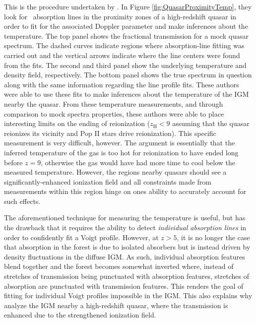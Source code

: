 This is the procedure undertaken by \cite{BoltonQuasar}. In Figure \ref{fig:QuasarProximityTemp}, they look for \lya\ absorption lines in the proximity zones of a high-redshift quasar in order to fit for the associated Doppler parameter and make inferences about the temperature. The top panel shows the fractional transmission for a mock quasar spectrum. The dashed curves indicate regions where absorption-line fitting was carried out and the vertical arrows indicate where the line centers were found from the fits. The second and third panel show the underlying temperature and density field, respectively. The bottom panel shows the true spectrum in question along with the same information regarding the line profile fits. These authors were able to use these fits to make inferences about the temperature of the IGM nearby the quasar. From these temperature measurements, and through comparison to mock spectra properties, these authors were able to place interesting limits on the ending of reionization ($z_{\text{H}} <  9$ assuming that the quasar reionizes its vicinity and Pop II stars drive reionization). This specific measurement is very difficult, however. The argument is essentially that the inferred temperature of the gas is too hot for reionization to have ended long before $z = 9$, otherwise the gas would have had more time to cool below the measured temperature. However, the regions nearby quasars should see a significantly-enhanced ionization field and all constraints made from measurements within this region hinge on ones ability to accurately account for such effects. 


The aforementioned technique for measuring the temperature is useful, but has the drawback that it requires the ability to detect \textit{individual absorption lines} in order to confidently fit a Voigt profile. However, at $z > 5$, it is no longer the case that absorption in the forest is due to isolated absorbers but is instead driven by density fluctuations in the diffuse IGM. As such, individual absorption features blend together and the forest becomes somewhat inverted where, instead of stretches of transmission being punctuated with absorption features, stretches of absorption are punctuated with transmission features. This renders the goal of fitting for individual Voigt profiles impossible in the IGM. This also explains why \cite{BoltonQuasar} analyze the IGM  nearby a high-redshift quasar, where the transmission is enhanced due to the strengthened ionization field. 


